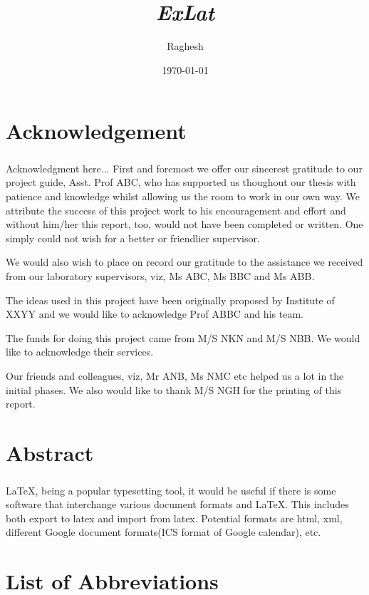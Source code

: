 \documentclass[a4paper,10pt]{mesreport}
\title{\emph{ExLat}}
\author{{Raghesh}}
\date{\today}
\begin{document}
\maketitle

\chapter*{Acknowledgement}
\thispagestyle{empty}
\paragraph{} Acknowledgment here...
First and foremost we offer our sincerest gratitude to our project guide,
Asst. Prof ABC, who has supported us thoughout our thesis with patience
and knowledge whilst allowing us the room to work in our own way. We attribute
the success of this project work to his encouragement and effort and without
him/her this report, too, would not have been completed or written. One simply
could not wish for a better or friendlier supervisor. 

We would also wish to place on record our gratitude to the assistance we
received from our laboratory supervisors, viz, Ms ABC, Ms BBC and Ms ABB.

The ideas used in this project have been originally proposed by Institute
of XXYY and we would like to acknowledge Prof ABBC and his team. 

The funds for doing this project came from M/S NKN and M/S NBB. We would
like to acknowledge their services.

Our friends and colleagues, viz, Mr ANB, Ms NMC etc helped us a lot in the
initial phases. We also would like to thank M/S NGH for the printing of this report.
\chapter*{Abstract}
\paragraph{}

LaTeX, being a popular typesetting tool, it would be useful if there is some software that interchange
various document formats and LaTeX. This includes both export to latex and import from latex.
Potential formats are html, xml, different Google document formats(ICS format of Google calendar), etc.

\tableofcontents
\listoffigures
\chapter*{List of Abbreviations}
\end{document}
